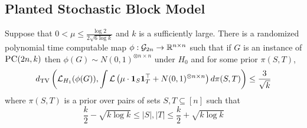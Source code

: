\documentclass[11pt]{article}
\begin{document}
\subsection{Planted Stochastic Block Model}

\begin{lemma}
Suppose that $0 < \mu \le \frac{\log 2}{2\sqrt{6\log k}}$ and $k$ is a sufficiently large. There is a randomized polynomial time computable map $\phi : \mathcal{G}_{2n} \to \mathbb{R}^{n \times n}$ such that if $G$ is an instance of $\textsc{PC}(2n, k)$ then $\phi(G) \sim N(0, 1)^{\otimes n \times n}$ under $H_0$ and for some prior $\pi(S, T)$,
$$d_{\text{TV}}\left( \mathcal{L}_{H_1}(\phi(G)), \int \mathcal{L}\left(\mu \cdot \mathbf{1}_S \mathbf{1}_T^\top + N(0, 1)^{\otimes n \times n} \right) d\pi(S, T) \right) \le \frac{3}{\sqrt{k}}$$
where $\pi(S, T)$ is a prior over pairs of sets $S, T \subseteq [n]$ such that
$$\frac{k}{2} - \sqrt{k \log k} \le |S|, |T| \le \frac{k}{2} + \sqrt{k \log k}$$
\end{lemma}
\end{document}
